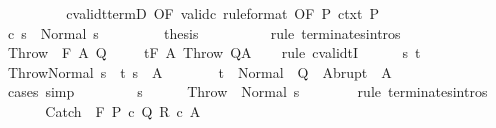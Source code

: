 \begin{isabellebody}
\ {\isacharminus}\isanewline
\ \ \ \ \ \ \isamarkupfalse%
\ cvalidt{\isacharunderscore}termD\ {\isacharbrackleft}OF\ valid{\isacharunderscore}c\ {\isacharbrackleft}rule{\isacharunderscore}format{\isacharcomma}\ OF\ P{\isacharbrackright}\ ctxt\ P{\isacharbrackright}\isanewline
\ \ \ \ \ \ \isamarkupfalse%
\ {\isachardoublequoteopen}{\isasymGamma}{\isasymturnstile}c\ s\ {\isasymdown}\ Normal\ s{\isachardoublequoteclose}\ \isacommand{{\isachardot}}\isamarkupfalse%
\isanewline
\ \ \ \ \ \ \isamarkupfalse%
\ {\isacharquery}thesis\isanewline
\ \ \ \ \ \ \ \ \isamarkupfalse%
\ {\isacharparenleft}rule\ terminates{\isachardot}intros{\isacharparenright}\isanewline
\ \ \ \ \isamarkupfalse%
\isanewline
\ \ \isamarkupfalse%
\isanewline
{}\isamarkupfalse%
\isanewline
\ \ \isamarkupfalse%
\ {\isacharparenleft}Throw\ {\isasymTheta}\ F\ A\ Q{\isacharparenright}\isanewline
\ \ \isamarkupfalse%
\ {\isachardoublequoteopen}{\isasymGamma}{\isacharcomma}{\isasymTheta}\ {\isasymTurnstile}\isactrlsub t\isactrlbsub {\isacharslash}F\isactrlesub \ A\ Throw\ Q{\isacharcomma}A{\isachardoublequoteclose}\isanewline
\ \ \isamarkupfalse%
\ {\isacharparenleft}rule\ cvalidtI{\isacharparenright}\isanewline
\ \ \ \ \isamarkupfalse%
\ s\ t\isanewline
\ \ \ \ \isamarkupfalse%
\ {\isachardoublequoteopen}{\isasymGamma}{\isasymturnstile}{\isasymlangle}Throw{\isacharcomma}Normal\ s{\isasymrangle}\ {\isasymRightarrow}\ t{\isachardoublequoteclose}\ {\isachardoublequoteopen}s\ {\isasymin}\ A{\isachardoublequoteclose}\isanewline
\ \ \ \ \isamarkupfalse%
\ \isamarkupfalse%
\ {\isachardoublequoteopen}t\ {\isasymin}\ Normal\ {\isacharbackquote}\ Q\ {\isasymunion}\ Abrupt\ {\isacharbackquote}\ A{\isachardoublequoteclose}\isanewline
\ \ \ \ \ \ \isamarkupfalse%
\ cases\ simp\isanewline
\ \ \isamarkupfalse%
\isanewline
\ \ \ \ \isamarkupfalse%
\ s\isanewline
\ \ \ \ \isamarkupfalse%
\ {\isachardoublequoteopen}{\isasymGamma}{\isasymturnstile}Throw\ {\isasymdown}\ Normal\ s{\isachardoublequoteclose}\isanewline
\ \ \ \ \ \ \isamarkupfalse%
\ {\isacharparenleft}rule\ terminates{\isachardot}intros{\isacharparenright}\isanewline
\ \ \isamarkupfalse%
\isanewline
{}\isamarkupfalse%
\isanewline
\ \ \isamarkupfalse%
\ {\isacharparenleft}Catch\ {\isasymTheta}\ F\ P\ c\ Q\ R\ c\ A{\isacharparenright}\isanewline

\end{isabellebody}

